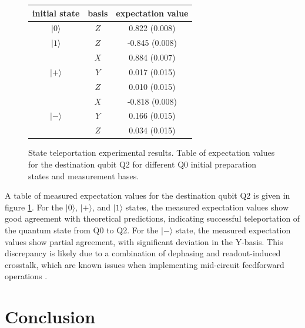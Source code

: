 \documentclass[journal]{IEEEtran}
\begin{document}
\begin{figure}
\centering
    \begin{tabular}{c | c | c }
        initial state & basis & expectation
        value \\
        \hline
        \hline
        $|0 \rangle$ & $Z$ & 0.822 (0.008) \\
        \hline
        $|1 \rangle$ & $Z$ & -0.845 (0.008) \\
        \hline
        $ $ & $X$ & 0.884 (0.007) \\
        $|+ \rangle$ & $Y$ & 0.017 (0.015) \\
        $ $ & $Z$ & 0.010 (0.015) \\
        \hline
        $ $ & $X$ & -0.818 (0.008)\\
        $|- \rangle$ & $Y$ & 0.166 (0.015) \\
        $ $ & $Z$ & 0.034 (0.015) \\
    \end{tabular}
    \caption{State teleportation experimental results. Table of expectation values for the destination qubit Q2 for different Q0 initial preparation states and measurement bases.}
    \label{fig:teleport_ev_table}
\end{figure}

A table of measured expectation values for the destination qubit Q2 is given in figure \ref{fig:teleport_ev_table}. For the $| 0 \rangle$, $| + \rangle$, and $| 1 \rangle$ states, the measured expectation values show good agreement with theoretical predictions, indicating successful teleportation of the quantum state from Q0 to Q2. For the $| - \rangle$ state, the measured expectation values show partial agreement, with significant deviation in the Y-basis. This discrepancy is likely due to a combination of dephasing and readout-induced crosstalk, which are known issues when implementing mid-circuit feedforward operations \cite{hashim2024efficient, gambetta2006qubit, mitchell2021hardware}.





\section{Conclusion}
\end{document}
